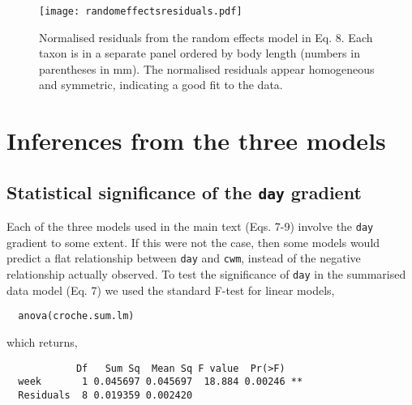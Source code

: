 \documentclass[12pt]{ecologyFORAPPENDIX}
\newcommand{\processfloatnow}{
	\begingroup
	\let\cleardoublepage\relax
	\let\clearpage\relax
	\processdelayedfloats
	\endgroup
}
\begin{document}



\begin{figure}
\texttt{[image: randomeffectsresiduals.pdf]}
\caption{Normalised residuals from the random effects model in Eq. 8.  Each taxon is in a separate panel ordered by body length (numbers in parentheses in mm).  The normalised residuals appear homogeneous and symmetric, indicating a good fit to the data.}
\label{fig:randomeffectsresiduals}
\end{figure}
\processfloatnow

\section{Inferences from the three models}

\subsection{Statistical significance of the \texttt{day} gradient}

Each of the three models used in the main text (Eqs. 7-9) involve the \texttt{day} gradient to some extent.  If this were not the case, then some models would predict a flat relationship between \texttt{day} and \texttt{cwm}, instead of the negative relationship actually observed.  To test the significance of \texttt{day} in the summarised data model (Eq. 7) we used the standard F-test for linear models,
\vspace{-16pt}
\singlespace 
\begin{verbatim}
  anova(croche.sum.lm)  
\end{verbatim}
\doublespace
which returns,
\vspace{-16pt}
\singlespace 
\begin{verbatim}
            Df   Sum Sq  Mean Sq F value  Pr(>F)   
  week       1 0.045697 0.045697  18.884 0.00246 **
  Residuals  8 0.019359 0.002420
\end{verbatim}
\doublespace
\end{document}
